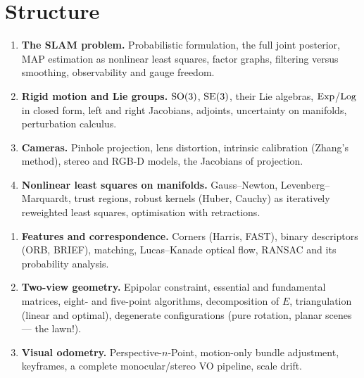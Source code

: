 \section*{Structure}

\begin{description}[leftmargin=1.5em,style=nextline]
\item[Part I --- Foundations]
  \begin{enumerate}[label=\arabic*.,leftmargin=2em]
  \item \textbf{The SLAM problem.} Probabilistic formulation, the full joint
    posterior, MAP estimation as nonlinear least squares, factor graphs,
    filtering versus smoothing, observability and gauge freedom.
  \item \textbf{Rigid motion and Lie groups.} $\mathrm{SO}(3)$, $\mathrm{SE}(3)$, their Lie
    algebras, $\operatorname{Exp}$/$\operatorname{Log}$ in closed form, left and right Jacobians,
    adjoints, uncertainty on manifolds, perturbation calculus.
  \item \textbf{Cameras.} Pinhole projection, lens distortion, intrinsic
    calibration (Zhang's method), stereo and RGB-D models, the Jacobians of
    projection.
  \item \textbf{Nonlinear least squares on manifolds.} Gauss--Newton,
    Levenberg--Marquardt, trust regions, robust kernels (Huber, Cauchy) as
    iteratively reweighted least squares, optimisation with retractions.
  \end{enumerate}
\item[Part II --- The visual front-end]
  \begin{enumerate}[label=\arabic*.,leftmargin=2em,start=5]
  \item \textbf{Features and correspondence.} Corners (Harris, FAST),
    binary descriptors (ORB, BRIEF), matching, Lucas--Kanade optical flow,
    RANSAC and its probability analysis.
  \item \textbf{Two-view geometry.} Epipolar constraint, essential and
    fundamental matrices, eight- and five-point algorithms, decomposition
    of $E$, triangulation (linear and optimal), degenerate configurations
    (pure rotation, planar scenes --- the lawn!).
  \item \textbf{Visual odometry.} Perspective-$n$-Point, motion-only bundle
    adjustment, keyframes, a complete monocular/stereo VO pipeline, scale
    drift.
  \end{enumerate}
\item[Part III --- The back-end]
  \begin{enumerate}[label=\arabic*.,leftmargin=2em,start=8]

\end{enumerate}
\end{description}
